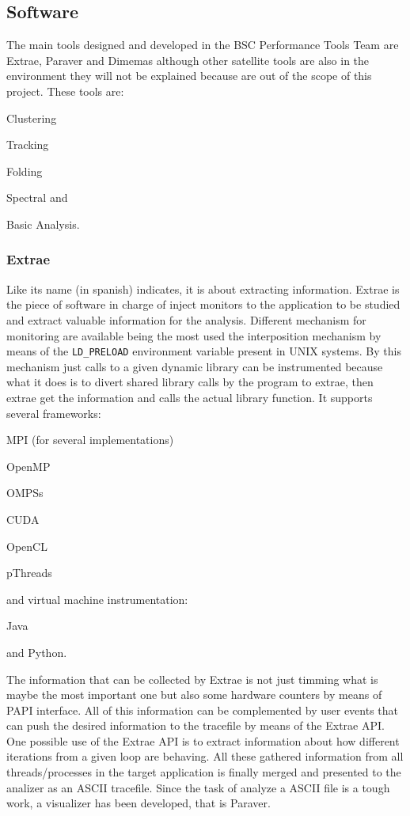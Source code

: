 \subsection{Software}

The main tools designed and developed in the BSC Performance Tools Team are 
Extrae, Paraver and Dimemas although other satellite tools are also in the 
environment they will not be explained because are out of the scope of this 
project. These tools are: 
\begin{enumerate*}[label=\roman*)]
  \item Clustering
  \item Tracking
  \item Folding
  \item Spectral and 
  \item Basic Analysis.
\end{enumerate*}

\subsubsection{Extrae}

Like its name (in spanish) indicates, it is about extracting information. Extrae is
the piece of software in charge of inject monitors to the application to
be studied and
extract valuable information for the analysis. Different mechanism for
monitoring are available being the most used the interposition mechanism by
means of the {\tt LD\_PRELOAD} environment variable present in UNIX systems.
By this mechanism just calls to a given dynamic library can be instrumented because
what it does is to divert shared library calls by the program to extrae, then 
extrae get the information and calls the actual library function. It supports 
several frameworks: 
\begin{enumerate*}[label=\roman*)]
  \item MPI (for several implementations)
  \item OpenMP
  \item OMPSs
  \item CUDA
  \item OpenCL
  \item pThreads
\end{enumerate*}
and virtual machine instrumentation: 
\begin{enumerate*}[label=\roman*)]
  \item Java
  \item and Python.
\end{enumerate*}
The information that can be collected by Extrae is not just timming what is maybe
the most important one but also some hardware counters by means of PAPI
interface. All of this information can be complemented by user events that can
push the desired information to the tracefile by means of the Extrae API. One
possible use of the Extrae API is to extract information about how different
iterations from a given loop are behaving. All these gathered information from 
all threads/processes in the target application is finally merged and presented 
to the analizer as an ASCII tracefile. Since the task of analyze a ASCII file 
is a tough work, a visualizer has been developed, that is Paraver.


